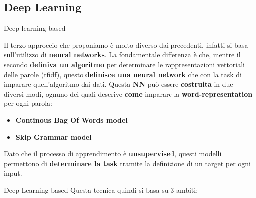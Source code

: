\documentclass[british]{beamer}
\begin{document}
\subsection{Deep Learning}

\begin{frame}{Deep learning based}
	
	Il terzo approccio che proponiamo \`{e} molto diverso dai precedenti, infatti si basa sull'utilizzo di \textbf{neural networks}.
	La fondamentale differenza \`{e} che, mentre il secondo \textbf{definiva un algoritmo} per determinare le rappresentazioni vettoriali delle parole (tfidf), questo \textbf{definisce una neural network} che con la task di imparare quell'algoritmo dai dati.
	Questa \textbf{NN} pu\`{o} essere \textbf{costruita} in due diversi modi, ognuno dei quali descrive \textbf{come} imparare la \textbf{word-representation} per ogni parola:
	\begin{itemize}
		\item \textbf{Continous Bag Of Words model}
		\item \textbf{Skip Grammar model}
	\end{itemize}
	Dato che il processo di apprendimento \`{e} \textbf{unsupervised}, questi modelli permettono di \textbf{determinare la task} tramite la definizione di un target per ogni input.
\end{frame}
	
\begin{frame}{Deep Learning based}
	Questa tecnica quindi si basa su 3 ambiti:
	\begin{figure}[!hf]
		\centering
	\end{figure}
\end{frame}
	
\end{document}

